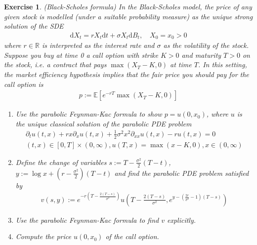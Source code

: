 \documentclass[12pt]{article}
\theoremstyle{colon}
\newtheorem{exercise}{Exercise}
\begin{document}
\begin{exercise}
  (Black-Scholes formula) In the Black-Scholes model, the price of any given stock is modelled (under a suitable probability measure) as the unique strong solution of the SDE
  \begin{gather*}
    \text{d} X_t = r X_t \text{d}t + \sigma X_t \text{d}B_t, \quad X_0 = x_0 > 0
  \end{gather*}
  where $r \in \mathbb{R}$ is interpreted as the interest rate and $\sigma$ as the volatility of the stock. Suppose you buy at time 0 a \textit{call option} with strike $K > 0$ and maturity $T > 0$ on the stock, i.e. a contract that pays $\max (X_T - K, 0)$ at time $T$. In this setting, the market efficiency hypothesis implies that the fair price you should pay for the call option is
  \begin{gather*}
    p := \mathbb{E}[e^{-r T} \max(X_T - K, 0)]
  \end{gather*}
  \begin{enumerate}[label=\alph*)]
    \item Use the parabolic Feynman-Kac formula to show $p = u(0, x_0)$, where $u$ is the unique classical solution of the parabolic PDE problem
      \begin{gather*}
        \partial_t u(t,x) + rx \partial_x u(t,x) + \frac{1}{2} \sigma^2 x^2 \partial_{xx} u(t,x) - r u(t,x) = 0 \\
        (t,x) \in [0,T] \times (0, \infty), u(T,x) = \max (x - K, 0), x \in (0, \infty)
      \end{gather*}
    \item Define the change of variables $s := T - \frac{\sigma^2}{2} (T - t)$, $y := \log x + (r - \frac{\sigma^2}{2})(T-t)$ and find the parabolic PDE problem satisfied by
      \begin{gather*}
        v(s, y) := e^{-r \left( T - \frac{2(T-s)}{\sigma^2} \right)} u \left(T - \frac{2(T-s)}{\sigma^2}, e^{y - \left( \frac{2r}{\sigma^2} - 1 \right)(T-s)} \right)
      \end{gather*}
    \item Use the parabolic Feynman-Kac formula to find $v$ \textit{explicitly}.
    \item Compute the price $u(0, x_0)$ of the call option.
  \end{enumerate}
\end{exercise}
\end{document}
